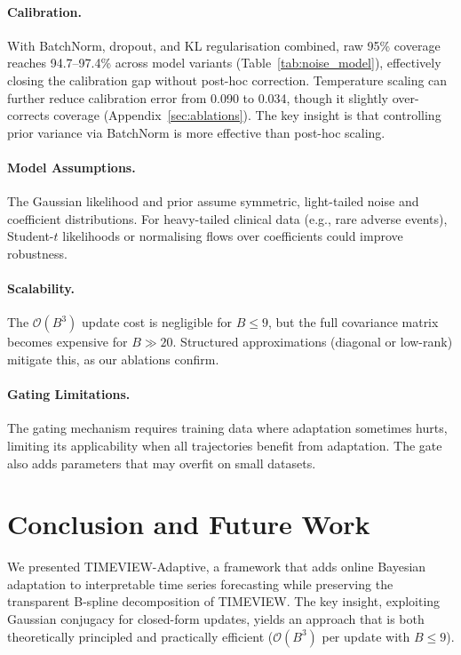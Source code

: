 \documentclass[final]{article}
\begin{document}
\paragraph{Calibration.} With BatchNorm, dropout, and KL regularisation combined, raw 95\% coverage reaches 94.7--97.4\% across model variants (Table~\ref{tab:noise_model}), effectively closing the calibration gap without post-hoc correction. Temperature scaling can further reduce calibration error from 0.090 to 0.034, though it slightly over-corrects coverage (Appendix~\ref{sec:ablations}). The key insight is that controlling prior variance via BatchNorm is more effective than post-hoc scaling.

\paragraph{Model Assumptions.} The Gaussian likelihood and prior assume symmetric, light-tailed noise and coefficient distributions. For heavy-tailed clinical data (e.g., rare adverse events), Student-$t$ likelihoods or normalising flows over coefficients could improve robustness.

\paragraph{Scalability.} The $\mathcal{O}(B^3)$ update cost is negligible for $B \leq 9$, but the full covariance matrix becomes expensive for $B \gg 20$. Structured approximations (diagonal or low-rank) mitigate this, as our ablations confirm.

\paragraph{Gating Limitations.} The gating mechanism requires training data where adaptation sometimes hurts, limiting its applicability when all trajectories benefit from adaptation. The gate also adds parameters that may overfit on small datasets.

\section{Conclusion and Future Work}
\label{sec:conclusion}

We presented TIMEVIEW-Adaptive, a framework that adds online Bayesian adaptation to interpretable time series forecasting while preserving the transparent B-spline decomposition of TIMEVIEW. The key insight, exploiting Gaussian conjugacy for closed-form updates, yields an approach that is both theoretically principled and practically efficient ($\mathcal{O}(B^3)$ per update with $B \leq 9$).
\end{document}
